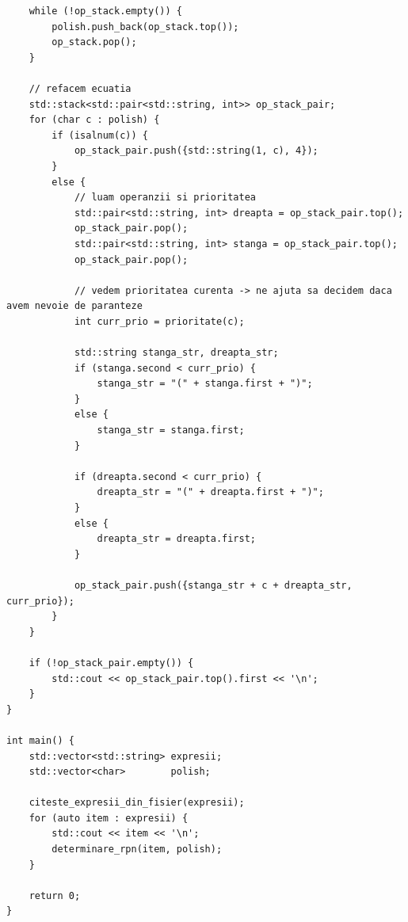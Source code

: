 \documentclass[12pt]{book}
\begin{document}
\begin{lstlisting}
    while (!op_stack.empty()) {
        polish.push_back(op_stack.top());
        op_stack.pop();
    }

    // refacem ecuatia
    std::stack<std::pair<std::string, int>> op_stack_pair;
    for (char c : polish) {
        if (isalnum(c)) {
            op_stack_pair.push({std::string(1, c), 4});
        }
        else {
            // luam operanzii si prioritatea
            std::pair<std::string, int> dreapta = op_stack_pair.top();
            op_stack_pair.pop();
            std::pair<std::string, int> stanga = op_stack_pair.top();
            op_stack_pair.pop();

            // vedem prioritatea curenta -> ne ajuta sa decidem daca avem nevoie de paranteze
            int curr_prio = prioritate(c);

            std::string stanga_str, dreapta_str;
            if (stanga.second < curr_prio) {
                stanga_str = "(" + stanga.first + ")";
            }
            else {
                stanga_str = stanga.first;
            }

            if (dreapta.second < curr_prio) {
                dreapta_str = "(" + dreapta.first + ")";
            }
            else {
                dreapta_str = dreapta.first;
            }

            op_stack_pair.push({stanga_str + c + dreapta_str, curr_prio});
        }
    }

    if (!op_stack_pair.empty()) {
        std::cout << op_stack_pair.top().first << '\n';
    }
}

int main() {
    std::vector<std::string> expresii;
    std::vector<char>        polish;

    citeste_expresii_din_fisier(expresii);
    for (auto item : expresii) {
        std::cout << item << '\n';
        determinare_rpn(item, polish);
    }

    return 0;
}
\end{lstlisting}
\end{document}

